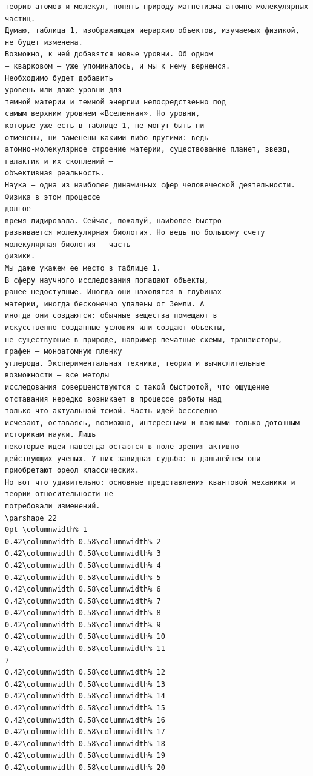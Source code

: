 \documentclass[a4paper,10pt]{article}
\begin{document}
\begin{verbatim}
теорию атомов и молекул, понять природу магнетизма атомно-молекулярных частиц.
Думаю, таблица 1, изображающая иерархию объектов, изучаемых физикой, не будет изменена.
Возможно, к ней добавятся новые уровни. Об одном
– кварковом – уже упоминалось, и мы к нему вернемся.
Необходимо будет добавить
уровень или даже уровни для
темной материи и темной энергии непосредственно под
самым верхним уровнем «Вселенная». Но уровни,
которые уже есть в таблице 1, не могут быть ни
отменены, ни заменены какими-либо другими: ведь
атомно-молекулярное строение материи, существование планет, звезд, галактик и их скоплений –
объективная реальность.
Наука – одна из наиболее динамичных сфер человеческой деятельности. Физика в этом процессе
долгое
время лидировала. Сейчас, пожалуй, наиболее быстро
развивается молекулярная биология. Но ведь по большому счету молекулярная биология – часть
физики.
Мы даже укажем ее место в таблице 1.
В сферу научного исследования попадают объекты,
ранее недоступные. Иногда они находятся в глубинах
материи, иногда бесконечно удалены от Земли. А
иногда они создаются: обычные вещества помещают в
искусственно созданные условия или создают объекты,
не существующие в природе, например печатные схемы, транзисторы, графен – моноатомную пленку
углерода. Экспериментальная техника, теории и вычислительные возможности – все методы
исследования совершенствуются с такой быстротой, что ощущение
отставания нередко возникает в процессе работы над
только что актуальной темой. Часть идей бесследно
исчезают, оставаясь, возможно, интересными и важными только дотошным историкам науки. Лишь
некоторые идеи навсегда остаются в поле зрения активно
действующих ученых. У них завидная судьба: в дальнейшем они приобретают ореол классических.
Но вот что удивительно: основные представления квантовой механики и теории относительности не
потребовали изменений.
\parshape 22
0pt \columnwidth% 1
0.42\columnwidth 0.58\columnwidth% 2
0.42\columnwidth 0.58\columnwidth% 3
0.42\columnwidth 0.58\columnwidth% 4
0.42\columnwidth 0.58\columnwidth% 5
0.42\columnwidth 0.58\columnwidth% 6
0.42\columnwidth 0.58\columnwidth% 7
0.42\columnwidth 0.58\columnwidth% 8
0.42\columnwidth 0.58\columnwidth% 9
0.42\columnwidth 0.58\columnwidth% 10
0.42\columnwidth 0.58\columnwidth% 11
7
0.42\columnwidth 0.58\columnwidth% 12
0.42\columnwidth 0.58\columnwidth% 13
0.42\columnwidth 0.58\columnwidth% 14
0.42\columnwidth 0.58\columnwidth% 15
0.42\columnwidth 0.58\columnwidth% 16
0.42\columnwidth 0.58\columnwidth% 17
0.42\columnwidth 0.58\columnwidth% 18
0.42\columnwidth 0.58\columnwidth% 19
0.42\columnwidth 0.58\columnwidth% 20

\end{verbatim}
\end{document}
